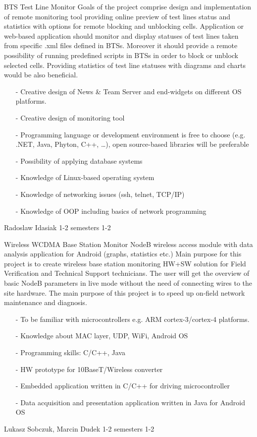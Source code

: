\begin{project}
{BTS Test Line Monitor}
{
Goals of the project comprise design and implementation of remote monitoring
tool providing online preview of test lines status and statistics with options for remote blocking and unblocking cells. } 
{
Application or web-based application should monitor and display statuses of test
lines taken from specific .xml files defined in BTSs. Moreover it should provide a remote possibility of running predefined scripts in BTSs in order to block or unblock selected cells. Providing statistics of test line statuses with diagrams and charts would be also beneficial. }
{
\begin{itemize}
\item[-] Creative design of News \& Team Server and end-widgets on different OS
platforms.
\item[-] Creative design of monitoring tool
\item[-] Programming language or development environment is free to choose
(e.g. .NET, Java, Phyton, C++, \dots), open source-based libraries will be
preferable
\item[-]  Possibility of applying database systems
\item[-]  Knowledge of Linux-based operating system
\item[-]  Knowledge of networking issues (ssh, telnet, TCP/IP)
\item[-]  Knowledge of OOP including basics of network programming
\end{itemize} }
{Radoslaw Idasiak}
{1-2 semesters}
{1-2}
\end{project}
\begin{project}
{Wireless WCDMA Base Station Monitor}
{
NodeB wireless access module with data analysis application for Android (graphs, statistics etc.) } 
{
Main purpose for this project is to create wireless base station monitoring
HW+SW solution for Field Verification and Technical Support technicians.
The user will get the overview of basic NodeB parameters in live mode without the
need of connecting wires to the site hardware. The main purpose of this project 
is to speed up on-field network maintenance and diagnosis. 
}
{
\begin{itemize}
\item[-] To be familiar with microcontrollers e.g. ARM cortex-3/cortex-4
platforms.
\item[-] Knowledge about MAC layer, UDP, WiFi, Android OS
\item[-] Programming skills: C/C++, Java
\item[-] HW prototype for 10BaseT/Wireless converter
\item[-] Embedded application written in C/C++ for driving microcontroller
\item[-] Data acquisition and presentation application written in Java for Android OS
\end{itemize} 
}
{Lukasz Sobczuk, Marcin Dudek}
{1-2 semesters}
{1-2}
\end{project}
